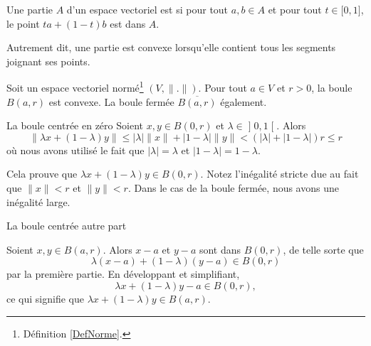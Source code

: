\begin{definition}        \label{DEFooQQEOooAFKbcQ}
    Une partie \( A\) d'un espace vectoriel est  si pour tout \( a,b\in A\) et pour tout \( t\in \mathopen[ 0 , 1 \mathclose]\), le point \( ta+(1-t)b\) est dans \( A\).

    Autrement dit, une partie est convexe lorsqu'elle contient tous les segments joignant ses points.
\end{definition}

\begin{example}     \label{EXooKZAOooVZtAhX}
    Soit un espace vectoriel normé\footnote{Définition \ref{DefNorme}.} \( (V,\| . \|)\). Pour tout \( a\in V\) et \( r>0\), la boule \( B(a,r)\) est convexe. La boule fermée \( \overline{ B(a,r) }\) également.

    \begin{subproof}
        \item[La boule centrée en zéro]
            Soient \( x,y\in B(0,r)\) et \( \lambda\in\mathopen] 0 , 1 \mathclose[\). Alors
                \begin{equation}
                    \| \lambda x+(1-\lambda)y \|\leq | \lambda |\| x \|+| 1-\lambda |\| y \|< (| \lambda | +| 1-\lambda |)r\leq r
                \end{equation}
                où nous avons utilisé le fait que \( | \lambda |=\lambda\) et \( | 1-\lambda |=1-\lambda\).

                Cela prouve que \( \lambda x+(1-\lambda)y\in B(0,r)\). Notez l'inégalité stricte due au fait que \( \| x \|<r\) et \( \| y \|<r\). Dans le cas de la boule fermée, nous avons une inégalité large.

            \item[La boule centrée autre part]

                Soient \( x,y\in B(a,r)\). Alors \( x-a\) et \( y-a\) sont dans \( B(0,r)\), de telle sorte que
                \begin{equation}
                    \lambda(x-a)+(1-\lambda)(y-a)\in B(0,r)
                \end{equation}
                par la première partie. En développant et simplifiant,
                \begin{equation}
                    \lambda x+(1-\lambda)y-a\in B(0,r),
                \end{equation}
                ce qui signifie que \( \lambda x+(1-\lambda)y\in B(a,r)\).
    \end{subproof}
\end{example}

